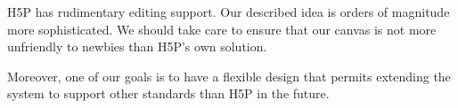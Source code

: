 H5P has rudimentary editing support\cite{h5pcontent}. Our described idea is 
orders of magnitude more sophisticated. We should take care to ensure that our 
canvas is not more unfriendly to newbies than H5P's own solution.

Moreover, one of our goals is to have a flexible design that permits extending 
the system to support other standards than H5P in the future.
